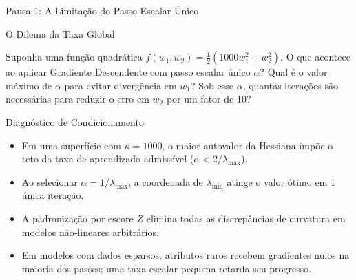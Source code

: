 \documentclass[aspectratio=169, 10pt]{beamer}
\newenvironment{callouttip}[1][Dica]{%
  \begin{exampleblock}{#1}%
}{%
  \end{exampleblock}%
}
\newcommand{\qmark}{\textbf{$\square$}}
\begin{document}
\begin{frame}{Pausa 1: A Limitação do Passo Escalar Único}
  \begin{callouttip}[O Dilema da Taxa Global]
    Suponha uma função quadrática $f(w_1, w_2) = \frac{1}{2}(1000 w_1^2 + w_2^2)$. O que acontece ao aplicar Gradiente Descendente com passo escalar único $\alpha$? Qual é o valor máximo de $\alpha$ para evitar divergência em $w_1$? Sob esse $\alpha$, quantas iterações são necessárias para reduzir o erro em $w_2$ por um fator de 10?
  \end{callouttip}

  \begin{callouttip}[Diagnóstico de Condicionamento]
    \begin{itemize}
      \item[\qmark] Em uma superfície com $\kappa = 1000$, o maior autovalor da Hessiana impõe o teto da taxa de aprendizado admissível ($\alpha < 2/\lambda_{\max}$).
      \item[\qmark] Ao selecionar $\alpha = 1/\lambda_{\max}$, a coordenada de $\lambda_{\min}$ atinge o valor ótimo em 1 única iteração.
      \item[\qmark] A padronização por escore $Z$ elimina todas as discrepâncias de curvatura em modelos não-lineares arbitrários.
      \item[\qmark] Em modelos com dados esparsos, atributos raros recebem gradientes nulos na maioria dos passos; uma taxa escalar pequena retarda seu progresso.
    \end{itemize}
  \end{callouttip}
\end{frame}
\end{document}
